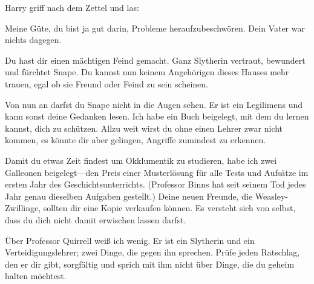 Harry griff nach dem Zettel und las:

\begin{writtenNote}
Meine Güte, du bist ja gut darin, Probleme heraufzubeschwören. Dein Vater war nichts dagegen.

Du hast dir einen mächtigen Feind gemacht. Ganz Slytherin vertraut, bewundert und fürchtet Snape. Du kannst nun keinem Angehörigen dieses Hauses mehr trauen, egal ob sie Freund oder Feind zu sein scheinen.

Von nun an darfst du Snape nicht in die Augen sehen. Er ist ein Legilimens und kann sonst deine Gedanken lesen. Ich habe ein Buch beigelegt, mit dem du lernen kannst, dich zu schützen. Allzu weit wirst du ohne einen Lehrer zwar nicht kommen, es könnte dir aber gelingen, Angriffe zumindest zu erkennen.

Damit du etwas Zeit findest um Okklumentik zu studieren, habe ich zwei Galleonen beigelegt—den Preis einer Musterlösung für alle Tests und Aufsätze im ersten Jahr des Geschichtsunterrichts. (Professor Binns hat seit seinem Tod jedes Jahr genau dieselben Aufgaben gestellt.) Deine neuen Freunde, die Weasley-Zwillinge, sollten dir eine Kopie verkaufen können. Es versteht sich von selbst, dass du dich nicht damit erwischen lassen darfst.

Über Professor Quirrell weiß ich wenig. Er ist ein Slytherin und ein Verteidigungslehrer; zwei Dinge, die gegen ihn sprechen. Prüfe jeden Ratschlag, den er dir gibt, sorgfältig und sprich mit ihm nicht über Dinge, die du geheim halten möchtest.


\end{writtenNote}
